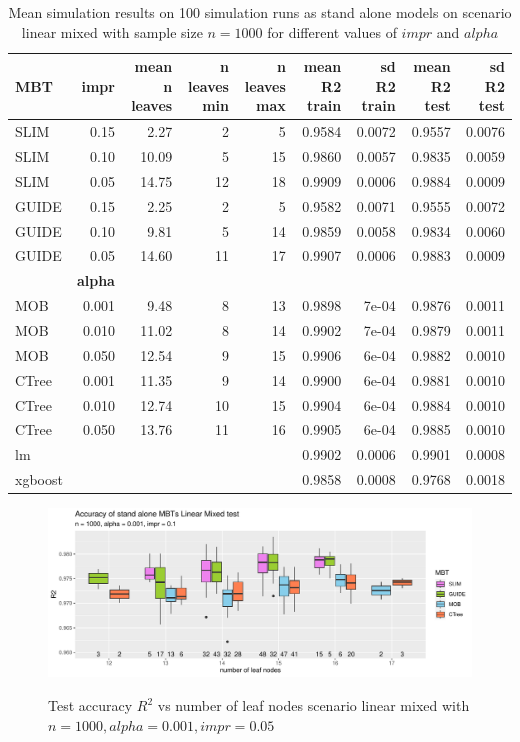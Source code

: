 \begin{table} 
\caption{Mean simulation results on 100 simulation runs as stand alone models on scenario linear mixed with sample size $n = 1000$ for different values of $impr$ and $alpha$}
\centering \tiny
\begin{tabular}[t]{l|r|r|r|r|r|r|r|r}
\hline
MBT & \textbf{impr} & mean n leaves & n leaves min & n leaves max & mean R2 train & sd R2 train & mean R2 test & sd R2 test\\
\hline
SLIM & 0.15 & 2.27 & 2 & 5 & 0.9584 & 0.0072 & 0.9557 & 0.0076\\
SLIM & 0.10 & 10.09 & 5 & 15 & 0.9860 & 0.0057 & 0.9835 & 0.0059\\
SLIM & 0.05 & 14.75 & 12 & 18 & 0.9909 & 0.0006 & 0.9884 & 0.0009\\
GUIDE & 0.15 & 2.25 & 2 & 5 & 0.9582 & 0.0071 & 0.9555 & 0.0072\\
GUIDE & 0.10 & 9.81 & 5 & 14 & 0.9859 & 0.0058 & 0.9834 & 0.0060\\
GUIDE & 0.05 & 14.60 & 11 & 17 & 0.9907 & 0.0006 & 0.9883 & 0.0009\\
\hline
 & \textbf{alpha} &  &  &  &  &  &  & \\
\hline
MOB & 0.001 & 9.48 & 8 & 13 & 0.9898 & 7e-04 & 0.9876 & 0.0011\\
MOB & 0.010 & 11.02 & 8 & 14 & 0.9902 & 7e-04 & 0.9879 & 0.0011\\
MOB & 0.050 & 12.54 & 9 & 15 & 0.9906 & 6e-04 & 0.9882 & 0.0010\\
CTree & 0.001 & 11.35 & 9 & 14 & 0.9900 & 6e-04 & 0.9881 & 0.0010\\
CTree & 0.010 & 12.74 & 10 & 15 & 0.9904 & 6e-04 & 0.9884 & 0.0010\\
CTree & 0.050 & 13.76 & 11 & 16 & 0.9905 & 6e-04 & 0.9885 & 0.0010\\
\hline
lm & & & & & 0.9902 & 0.0006 & 0.9901 & 0.0008\\
xgboost & & & & & 0.9858 & 0.0008 & 0.9768 & 0.0018\\
\hline
\end{tabular}
\label{tab:linear_smooth_summary}
\end{table}

\begin{figure}
\caption{Test accuracy $R^2$ vs number of leaf nodes scenario linear mixed with $n=1000, alpha = 0.001, impr = 0.05$}
    \includegraphics[width=16cm]{Figures/simulations/batchtools/basic_scenarios/linear_mixed/lm_1000_standalone_r2_test.pdf}
    \label{fig:lm_1000_standalone_r2_test}
\end{figure} 






